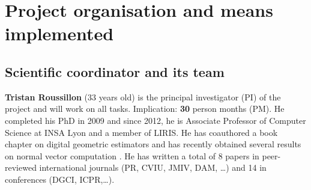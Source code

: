 \section{Project organisation and means implemented}
\label{sec:org}

\subsection{Scientific coordinator and its team}


\textbf{Tristan Roussillon} (33 years old) is the principal investigator (PI) of the project
and will work on all tasks. Implication: \textbf{30} person months (PM). 
He completed his PhD in 2009 and since 2012, he is Associate Professor of Computer Science at INSA Lyon
and a member of LIRIS. 
He has coauthored a book chapter on digital geometric estimators \cite{Coeurjolly2012} and
has recently obtained several results on normal vector computation \cite{LPRTCS2016,LPRDGCI2016,LPRJMIV2017}.    
He has written a total of 8 papers in peer-reviewed international journals (PR, CVIU, JMIV, DAM, \ldots) 
and 14 in conferences (DGCI, ICPR,\ldots).

